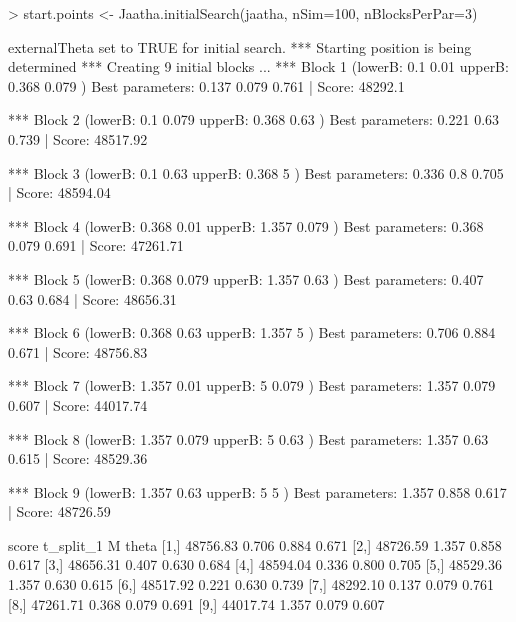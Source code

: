 
\begin{Schunk}
\begin{Sinput}
> start.points <- Jaatha.initialSearch(jaatha, nSim=100, nBlocksPerPar=3)
\end{Sinput}
\begin{Soutput}
externalTheta set to TRUE for initial search. 
*** Starting position is being determined *** 
Creating 9 initial blocks ...  
*** Block 1  (lowerB: 0.1 0.01  upperB: 0.368 0.079 ) 
Best parameters:  0.137 0.079 0.761 | Score: 48292.1 

*** Block 2  (lowerB: 0.1 0.079  upperB: 0.368 0.63 ) 
Best parameters:  0.221 0.63 0.739 | Score: 48517.92 

*** Block 3  (lowerB: 0.1 0.63  upperB: 0.368 5 ) 
Best parameters:  0.336 0.8 0.705 | Score: 48594.04 

*** Block 4  (lowerB: 0.368 0.01  upperB: 1.357 0.079 ) 
Best parameters:  0.368 0.079 0.691 | Score: 47261.71 

*** Block 5  (lowerB: 0.368 0.079  upperB: 1.357 0.63 ) 
Best parameters:  0.407 0.63 0.684 | Score: 48656.31 

*** Block 6  (lowerB: 0.368 0.63  upperB: 1.357 5 ) 
Best parameters:  0.706 0.884 0.671 | Score: 48756.83 

*** Block 7  (lowerB: 1.357 0.01  upperB: 5 0.079 ) 
Best parameters:  1.357 0.079 0.607 | Score: 44017.74 

*** Block 8  (lowerB: 1.357 0.079  upperB: 5 0.63 ) 
Best parameters:  1.357 0.63 0.615 | Score: 48529.36 

*** Block 9  (lowerB: 1.357 0.63  upperB: 5 5 ) 
Best parameters:  1.357 0.858 0.617 | Score: 48726.59 

         score t_split_1     M theta
 [1,] 48756.83     0.706 0.884 0.671
 [2,] 48726.59     1.357 0.858 0.617
 [3,] 48656.31     0.407 0.630 0.684
 [4,] 48594.04     0.336 0.800 0.705
 [5,] 48529.36     1.357 0.630 0.615
 [6,] 48517.92     0.221 0.630 0.739
 [7,] 48292.10     0.137 0.079 0.761
 [8,] 47261.71     0.368 0.079 0.691
 [9,] 44017.74     1.357 0.079 0.607
\end{Soutput}
\end{Schunk}

